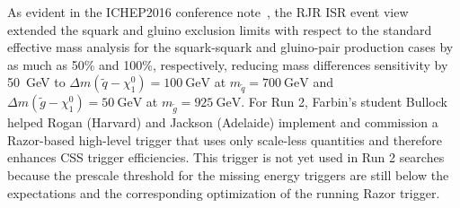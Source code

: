 As evident in the ICHEP2016 conference
note~\cite{ATLAS-CONF-2016-078}, the RJR ISR event view extended the
squark and gluino exclusion limits with respect to the standard
effective mass analysis for the squark-squark and gluino-pair
production cases by as much as 50\% and 100\%, respectively, reducing
mass differences sensitivity by 50~GeV to $\Delta m(\tilde{q} -
\chi_1^0) = 100~\mathrm{GeV}$ at $m_{\tilde{q}} = 700~\mathrm{GeV}$  and 
$\Delta m(\tilde{g} -\chi_1^0) = 50~\mathrm{GeV}$ at $m_{\tilde{g}} =
925~\mathrm{GeV}$. For Run 2, Farbin's student Bullock helped Rogan
(Harvard) and Jackson (Adelaide) implement and commission a
Razor-based high-level trigger that uses only scale-less quantities
and therefore enhances CSS trigger efficiencies. This trigger is not
yet used in Run 2 searches because the prescale threshold for the
missing energy triggers are still below the expectations and the
corresponding optimization of the running Razor trigger.




